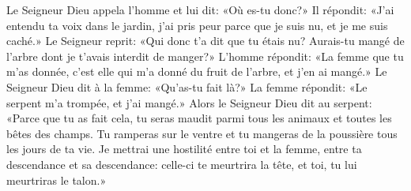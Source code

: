Le Seigneur Dieu appela l’homme et lui dit: «Où es-tu donc?»
Il répondit: «J’ai entendu ta voix dans le jardin,
	j’ai pris peur parce que je suis nu, et je me suis caché.»
Le Seigneur reprit: «Qui donc t’a dit que tu étais nu?
	Aurais-tu mangé de l’arbre dont je t’avais interdit de manger?»
L’homme répondit: «La femme que tu m’as donnée,
	c’est elle qui m’a donné du fruit de l’arbre, et j’en ai mangé.»
Le Seigneur Dieu dit à la femme: «Qu’as-tu fait là?»
La femme répondit: «Le serpent m’a trompée, et j’ai mangé.»
Alors le Seigneur Dieu dit au serpent:
	«Parce que tu as fait cela, tu seras maudit
	parmi tous les animaux et toutes les bêtes des champs.
	Tu ramperas sur le ventre et tu mangeras de la poussière
	tous les jours de ta vie.
Je mettrai une hostilité entre toi et la femme,
	entre ta descendance et sa descendance:
	celle-ci te meurtrira la tête, et toi, tu lui meurtriras le talon.»

